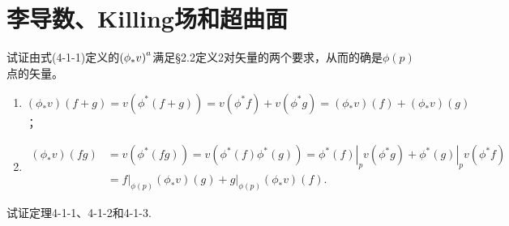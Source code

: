 
\chapter{李导数、Killing场和超曲面}
\begin{xiti}
	\item 试证由式(4-1-1)定义的$\tensor{\left(\phi_* v\right)}{^a}$满足\S 2.2定义2对矢量的两个要求，从而的确是$\phi(p)$点的矢量。

	\begin{zm}
		\begin{enumerate}
			\item $\left(\phi_* v\right) (f+g)= v(\phi^*(f+g))=v(\phi^* f)+ v(\phi^* g)= \left(\phi_* v\right)(f)+ \left(\phi_* v\right)(g) $；
			\item
			\begin{align*}
				\left(\phi_* v\right)(fg) &= v(\phi^*(fg))= v(\phi^*(f)\phi^*(g))= \left.\phi^*(f)\right|_p v(\phi^* g)+ \left.\phi^*(g)\right|_p v(\phi^* f)\\
				&= \left. f \right|_{\phi(p)}\left(\phi_* v\right)(g) + \left. g \right|_{\phi(p)}\left(\phi_* v\right)(f).
			\end{align*}
		\end{enumerate}
	\end{zm}

	\item 试证定理4-1-1、4-1-2和4-1-3.


\end{xiti}
